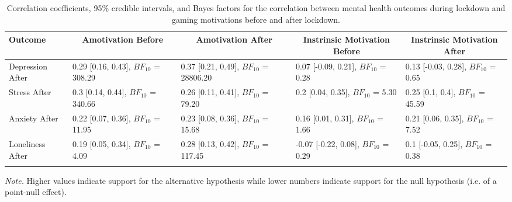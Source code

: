 \documentclass[
  english,
  jou,floatsintext]{apa6}
\begin{document}
\begin{table*}[tbp]

\begin{center}
\begin{threeparttable}

\caption{\label{tab:motivation-correlations}Correlation coefficients, 95\% credible intervals, and Bayes factors for the correlation between mental health outcomes during lockdown and gaming motivations before and after lockdown.}

\begin{tabular}{lllll}
\toprule
Outcome & \multicolumn{1}{c}{Amotivation Before} & \multicolumn{1}{c}{Amotivation After} & \multicolumn{1}{c}{Instrinsic Motivation Before} & \multicolumn{1}{c}{Instrinsic Motivation After}\\
\midrule
Depression After & \makecell[c]{0.29 [0.16, 0.43], \\$BF_{10}$ = 308.29} & \makecell[c]{0.37 [0.21, 0.49], \\$BF_{10}$ = 28806.20} & \makecell[c]{0.07 [-0.09, 0.21], \\$BF_{10}$ = 0.28} & \makecell[c]{0.13 [-0.03, 0.28], \\$BF_{10}$ = 0.65}\\
Stress After & \makecell[c]{0.3 [0.14, 0.44], \\$BF_{10}$ = 340.66} & \makecell[c]{0.26 [0.11, 0.41], \\$BF_{10}$ = 79.20} & \makecell[c]{0.2 [0.04, 0.35], \\$BF_{10}$ = 5.30} & \makecell[c]{0.25 [0.1, 0.4], \\$BF_{10}$ = 45.59}\\
Anxiety After & \makecell[c]{0.22 [0.07, 0.36], \\$BF_{10}$ = 11.95} & \makecell[c]{0.23 [0.08, 0.36], \\$BF_{10}$ = 15.68} & \makecell[c]{0.16 [0.01, 0.31], \\$BF_{10}$ = 1.66} & \makecell[c]{0.21 [0.06, 0.35], \\$BF_{10}$ = 7.52}\\
Loneliness After & \makecell[c]{0.19 [0.05, 0.34], \\$BF_{10}$ = 4.09} & \makecell[c]{0.28 [0.13, 0.42], \\$BF_{10}$ = 117.45} & \makecell[c]{-0.07 [-0.22, 0.08], \\$BF_{10}$ = 0.29} & \makecell[c]{0.1 [-0.05, 0.25], \\$BF_{10}$ = 0.38}\\
\bottomrule
\addlinespace
\end{tabular}

\begin{tablenotes}[para]
\normalsize{\textit{Note.} Higher values indicate support for the alternative hypothesis while lower numbers indicate support for the null hypothesis (i.e. of a point-null effect).}
\end{tablenotes}

\end{threeparttable}
\end{center}

\end{table*}
\end{document}
